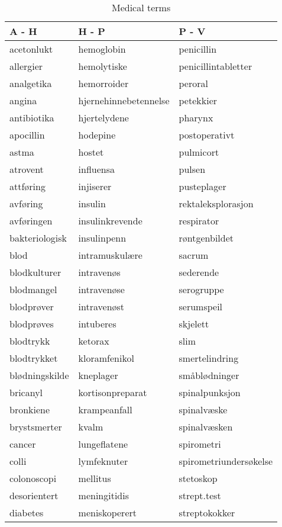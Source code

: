 \documentclass[a4paper, 11pt]{article}
\begin{document}
\begin{table}[htbp] \footnotesize \center
\caption{Medical terms\label{tab:medicalterms}}
\begin{tabular}{l l l}
    \toprule
    A - H & H - P & P - V \\
    \midrule
    acetonlukt & hemoglobin & penicillin \\
    allergier & hemolytiske & penicillintabletter \\
    analgetika & hemorroider & peroral \\
    angina & hjernehinnebetennelse & petekkier \\
    antibiotika & hjertelydene & pharynx \\
    apocillin & hodepine & postoperativt \\
    astma & hostet & pulmicort \\
    atrovent & influensa & pulsen \\
    attføring & injiserer & pusteplager \\
    avføring & insulin & rektaleksplorasjon \\
    avføringen & insulinkrevende & respirator \\
    bakteriologisk & insulinpenn & røntgenbildet \\
    blod & intramuskulære & sacrum \\
    blodkulturer & intravenøs & sederende \\
    blodmangel & intravenøse & serogruppe \\
    blodprøver & intravenøst & serumspeil \\
    blodprøves & intuberes & skjelett \\
    blodtrykk & ketorax & slim \\
    blodtrykket & kloramfenikol & smertelindring \\
    blødningskilde & kneplager & småblødninger \\
    bricanyl & kortisonpreparat & spinalpunksjon \\
    bronkiene & krampeanfall & spinalvæske \\
    brystsmerter & kvalm & spinalvæsken \\
    cancer & lungeflatene & spirometri \\
    colli & lymfeknuter & spirometriundersøkelse \\
    colonoscopi & mellitus & stetoskop \\
    desorientert & meningitidis & strept.test \\
    diabetes & meniskoperert & streptokokker \\

\end{tabular}
\end{table}
\end{document}
